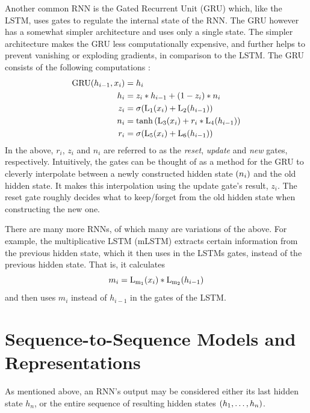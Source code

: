 Another common RNN is the Gated Recurrent Unit (GRU) which, like the LSTM, uses gates to regulate the internal state of the RNN. The GRU however has a somewhat simpler architecture and uses only a single state. The simpler architecture makes the GRU less computationally expensive, and further helps to prevent vanishing or exploding gradients, in comparison to the LSTM. The GRU consists of the following computations \cite{pytorchnn}:
\begin{align*}
    \mathrm{GRU}{\mathopen{} \left( h_{i - 1}, x_i \right) \mathclose{}} &= h_i \\
    h_i &= z_i * h_{i - 1} + {\mathopen{} \left( 1 - z_i \right) \mathclose{}} * n_i  \\
    z_i &= \mathrm{\sigma}{\mathopen{} \left( \mathrm{L_1}{\mathopen{} \left( x_i \right) \mathclose{}} + \mathrm{L_2}{\mathopen{} \left( h_{i - 1} \right) \mathclose{}} \right) \mathclose{}} \\
    n_i &= \tanh{\mathopen{} \left( \mathrm{L_3}{\mathopen{} \left( x_i \right) \mathclose{}} + r_i * \mathrm{L_4}{\mathopen{} \left( h_{i - 1} \right) \mathclose{}} \right) \mathclose{}} \\
    r_i &= \mathrm{\sigma}{\mathopen{} \left( \mathrm{L_5}{\mathopen{} \left( x_i \right) \mathclose{}} + \mathrm{L_6}{\mathopen{} \left( h_{i - 1} \right) \mathclose{}} \right) \mathclose{}}
\end{align*}
In the above, $r_i$, $z_i$ and $n_i$ are referred to as the \textit{reset}, \textit{update} and \textit{new} gates, respectively. Intuitively, the gates can be thought of as a method for the GRU to cleverly interpolate between a newly constructed hidden state ${\mathopen{} \left( n_i \right) \mathclose{}}$ and the old hidden state. It makes this interpolation using the update gate's result, $z_i$. The reset gate roughly decides what to keep/forget from the old hidden state when constructing the new one.

There are many more RNNs, of which many are variations of the above. For example, the multiplicative LSTM (mLSTM) \cite{krause2016multiplicative} extracts certain information from the previous hidden state, which it then uses in the LSTMs gates, instead of the previous hidden state. That is, it calculates
\[m_i = \mathrm{L_{m_1}}{\mathopen{} \left( x_i \right) \mathclose{}} * \mathrm{L_{m_2}}{\mathopen{} \left( h_{i - 1} \right) \mathclose{}}\]
and then uses $m_i$ instead of $h_{i - 1}$ in the gates of the LSTM.

\section{Sequence-to-Sequence Models and Representations}
\label{sec:seq2seqvsbottleneck}
As mentioned above, an RNN's output may be considered either its last hidden state $h_n$, or the entire sequence of resulting hidden states ${\mathopen{} \left( h_1, \dots, h_n \right) \mathclose{}}$.

